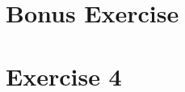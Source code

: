 \documentclass[a4paper, 12pt]{article}
\begin{document}
%
%
%
%
%
\section{Bonus Exercise}


\section{Exercise 4}

\end{document}
